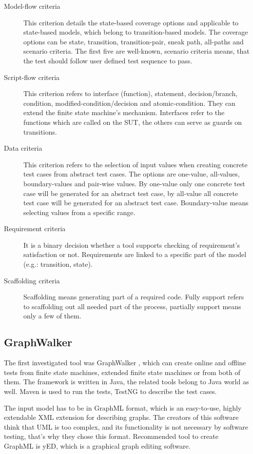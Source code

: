 \begin{description}
	\item[Model-flow criteria] This criterion details the state-based coverage options and applicable to state-based models, which belong to transition-based models. The coverage options can be state, transition, transition-pair, sneak path, all-paths and scenario criteria. The first five are well-known, scenario criteria means, that the test should follow user defined test sequence to pass.
	\item[Script-flow criteria] This criterion refers to interface (function), statement, decision/branch, condition, modified-condition/decision and atomic-condition. They can extend the finite state machine's mechanism. Interfaces refer to the functions which are called on the SUT, the others can serve as guards on transitions.
	\item[Data criteria] This criterion refers to the selection of input values when creating concrete test cases from abstract test cases. The options are one-value, all-values, boundary-values and pair-wise values. By one-value only one concrete test case will be generated for an abstract test case, by all-value all concrete test case will be generated for an abstract test case. Boundary-value means selecting values from a specific range.
	\item[Requirement criteria] It is a binary decision whether a tool supports checking of requirement's satisfaction or not. Requirements are linked to a specific part of the model (e.g.: transition, state).
	\item[Scaffolding criteria] Scaffolding means generating part of a required code. Fully support refers to scaffolding out all needed part of the process, partially support means only a few of them.
\end{description}

\subsection{GraphWalker}
\label{sub:graphwalker}

The first investigated tool was GraphWalker \cite{graphwalker}, which can create online and offline tests from finite state machines, extended finite state machines or from both of them. The framework is written in Java, the related tools belong to Java world as well. Maven is used to run the tests, TestNG to describe the test cases.

The input model has to be in GraphML format, which is an easy-to-use, highly extendable XML extension for describing graphs. The creators of this software think that UML is too complex, and its functionality is not necessary by software testing, that's why they chose this format. Recommended tool to create GraphML is yED, which is a graphical graph editing software.

